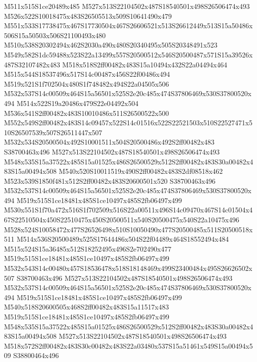 \documentclass{article}
\begin{document}
\begin{multicols}{2}
M511x515S1ce20489x485 M527x513S22104502x487S18540501x498S26506474x493 M526x522S10018475x483S26505513x509S10641490x479 M551x533S17738475x467S17730504x467S26606521x513S26612449x513S15a50486x506S15a50503x506S21100493x480 M510x538S20302494x462S2030a490x480S20340495x505S20348491x523 M549x582S1dc59488x523S22a13499x557S20500512x546S20500487x571S15a39526x487S32107482x483 M518x518S2ff00482x483S15a10494x432S22a04494x464 M515x544S18537496x517S14c00487x456S22f00486x494 M519x521S1f702504x480S1f748482x494S22a04505x506 M532x537S14c00509x464S15a56501x525S2e20c485x474S37806469x530S37800520x494 M514x522S19a20486x479S22e04492x504 M536x541S2ff00482x483S10010486x511S26500522x500 M552x549S2ff00482x483S14c09457x522S14c01516x522S22521503x510S22527471x510S26507539x507S26511447x507 M532x534S20500504x492S10001511x504S20500486x492S2ff00482x483 S38700463x496 M527x513S22104502x487S18540501x498S26506474x493 M548x535S15a37522x485S15a01525x486S26500529x512S2ff00482x483S30a00482x483S15a00494x508 M540x520S10011519x490S2ff00482x483S2df08518x462 M523x539S1850f481x512S2ff00482x483S20600501x520 S38700463x496 M532x537S14c00509x464S15a56501x525S2e20c485x474S37806469x530S37800520x494 M519x515S1ce18481x485S1ce10497x485S2fb06497x499 M530x551S1f70a472x516S1f702509x516S22a00511x496S14c09470x467S14c01504x467S22510504x450S22510475x450S20500511x540S20500475x540S22a10475x496 M528x524S10058472x477S26526498x510S10050490x477S20500485x511S20500518x511 M514x536S20500489x525S17644486x504S22f04489x464S18552494x484 M515x524S15a36485x512S18252495x496S2e702490x477 M519x515S1ce18481x485S1ce10497x485S2fb06497x499 M532x543S14c00480x457S18536478x518S18148469x499S23400484x495S26626502x507 S38700463x496 M527x513S22104502x487S18540501x498S26506474x493 M532x537S14c00509x464S15a56501x525S2e20c485x474S37806469x530S37800520x494 M519x515S1ce18481x485S1ce10497x485S2fb06497x499 M540x518S20600505x468S2ff00482x483S15a11517x483 M519x515S1ce18481x485S1ce10497x485S2fb06497x499 M548x535S15a37522x485S15a01525x486S26500529x512S2ff00482x483S30a00482x483S15a00494x508 M527x513S22104502x487S18540501x498S26506474x493 M518x572S2ff00482x483S30c00482x483S22a03480x537S15a51461x549S15a00494x509 S38800464x496


\end{multicols}
\end{document}
